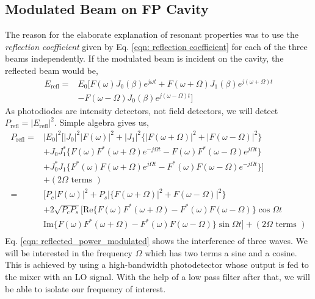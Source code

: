 \documentclass{Resources/cquicc}
\begin{document}
\subsection{Modulated Beam on FP Cavity}
The reason for the elaborate explanation of resonant properties was to use the \textit{reflection coefficient} given by Eq. \ref{eqn: reflection coefficient} for each of the three beams independently. If the modulated beam is incident on the cavity, the reflected beam would be, 
\begin{equation}
\begin{split}
  E_{\text{refl}} =& E_0[F(\omega) J_0 (\beta) e^{j\omega t}+ F(\omega+ \Omega) J_1 (\beta) e^{j(\omega+\Omega) t}  \\
   &- F(\omega-\Omega) J_0 (\beta) e^{j(\omega - \Omega)t} ]
  \end{split}
\end{equation}
As photodiodes are intensity detectors, not field detectors, we will detect $P_{\text{refl}} = |E_{\text{refl}}|^2$. Simple algebra gives us, 
\begin{equation}
\label{eqn: reflected_power_modulated}
    \begin{split}
        P_{\text{refl}} = & |E_0|^2 \Big[|J_0|^2|F(\omega)|^2 + |J_1|^2\{|F(\omega+\Omega)|^2+|F(\omega-\Omega)|^2\} \\
        & + J_0 J_1 ^ *\{ F(\omega) F^*(\omega+\Omega)e^{-j\Omega t } - F(\omega) F^*(\omega-\Omega) e^{j\Omega t}\} \\
        & + J_0^* J_1\{ F^*(\omega) F(\omega+\Omega)e^{j\Omega t } - F^*(\omega) F(\omega-\Omega) e^{-j\Omega t}\} \Big] \\& +(2 \Omega \text{ terms } ) \\
        = &\Big[P_c|F(\omega)|^2 + P_s|\{F(\omega+\Omega)|^2+F(\omega-\Omega)|^2\} \\
        & + 2\sqrt{P_c P_s}\Big[ \mathrm{Re}\{F(\omega) F^*(\omega+\Omega) - F^*(\omega) F(\omega-\Omega)\}\cos \Omega t \\
        & \mathrm{Im}\{F(\omega) F^*(\omega+\Omega)- F^*(\omega) F(\omega-\Omega) \} \sin \Omega t \Big] +(2 \Omega \text{ terms } )\\
    \end{split}
\end{equation}
Eq. \ref{eqn: reflected_power_modulated} shows the interference of three waves. We will be interested in the frequency $\Omega$ which has two terms a sine and a cosine. This is achieved by using a high-bandwidth photodetector whose output is fed to the mixer with an LO signal. With the help of a low pass filter after that, we will be able to isolate our frequency of interest.
\end{document}
